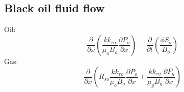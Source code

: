 

\subsection{Black oil fluid flow} %
\label{sub:black_oil_fluid_flow}
Oil:
\begin{equation}
  \frac{\partial }{\partial x} \left( \frac{kk_{ro}}{\mu_o B_o} \frac{\partial P_o}{\partial x} \right)
  = \frac{\partial }{\partial t} \left( \frac{\phi S_o}{B_o} \right)
\end{equation}
Gas:
\begin{equation}
  \frac{\partial }{\partial x} \left( R_{so} \frac{kk_{ro}}{\mu_o B_o} \frac{\partial P_o}{\partial x} + \frac{kk_{rg}}{\mu_g B_g} \frac{\partial P_g}{\partial x} \right)
\end{equation}


